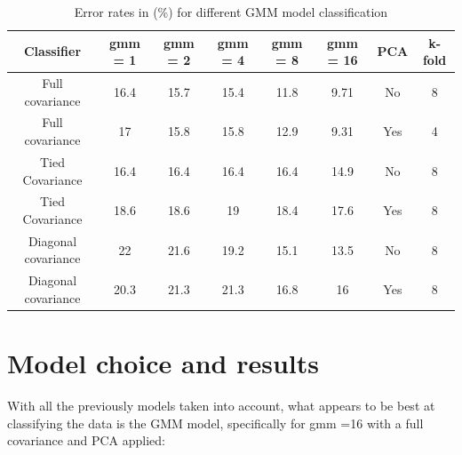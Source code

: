 \documentclass[twoside,a4paper,12pt]{report}
\begin{document}
\begin{table}[H]
    \centering
     \begin{tabular}{||c c c c c c c c||} 
        \hline \hline
        Classifier & gmm = 1 & gmm = 2 & gmm = 4 & gmm = 8 &gmm = 16 & PCA & k-fold\\
        \hline\hline
        Full covariance &  16.4 &  15.7 &  15.4 & \cellcolor{blue!25}  11.8 & \cellcolor{blue!25} 9.71 & No & 8  \\ 
        \hline
        Full covariance &  17 &  15.8 &  15.8 &  12.9 & \cellcolor{blue!25} 9.31 & Yes & 4  \\ 
        \hline
        Tied Covariance &  16.4 &  16.4 & 16.4 &  16.4 & 14.9  & No & 8  \\
        \hline
        Tied Covariance &  18.6 &  18.6 & 19 &  18.4 & 17.6  & Yes & 8  \\
        \hline
        Diagonal covariance  &  22 &  21.6 & 19.2 &  15.1 & 13.5  & No & 8 \\
        \hline
        Diagonal covariance &20.3 &  21.3 & 21.3&  16.8  & 16 & Yes & 8\\
        \hline \hline
    \end{tabular}
    \caption{Error rates in (\%) for different GMM model classification    \label{errorRatesGMMs}    }
\end{table}

    

\section{Model choice and results}
With all the previously models taken into account, what appears to be best at
classifying the data is the GMM model, specifically for gmm =16 with a full covariance
and PCA applied:
\end{document}
